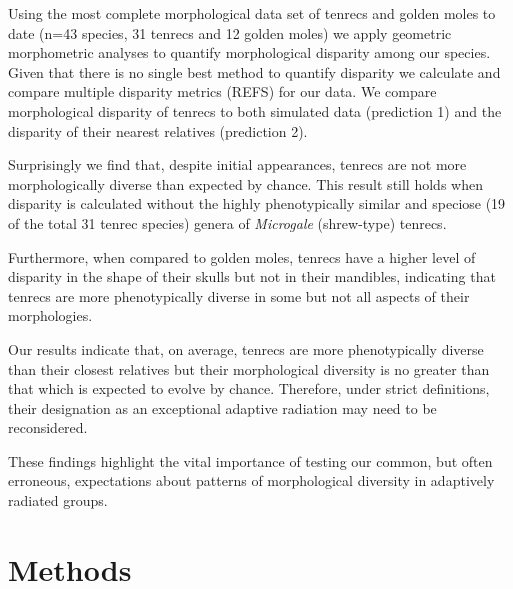 \documentclass[12pt,a4paper]{article}
\begin{document}
Using the most complete morphological data set of tenrecs and golden moles to date (n=43 species, 31 tenrecs and 12 golden moles) we apply geometric morphometric analyses \citep{Rohlf1993, Zelditch2012} to quantify morphological disparity among our species. Given that there is no single best method to quantify disparity \citep{Ciampaglio2001} we calculate and compare multiple disparity metrics (REFS) for our data. We compare morphological disparity of tenrecs to both simulated data (prediction 1) and the disparity of their nearest relatives (prediction 2). %

Surprisingly %
we find that, despite initial appearances, tenrecs are not more morphologically diverse than expected by chance. This result still holds when disparity is calculated without the highly phenotypically similar and speciose (19 of the total 31 tenrec species) genera of \textit{Microgale} (shrew-type) tenrecs.

Furthermore, when compared to golden moles, tenrecs have a higher level of disparity in the shape of their skulls but not in their mandibles, indicating that tenrecs are more phenotypically diverse in some but not all aspects of their morphologies.%

Our results indicate that, on average, tenrecs are more phenotypically diverse than their closest relatives but their morphological diversity is no greater than that which is expected to evolve by chance. Therefore, under strict definitions, their designation as an exceptional adaptive radiation may need to be reconsidered. 

These findings highlight the vital importance of testing our common, but often erroneous, expectations about patterns of morphological diversity in adaptively radiated groups. 


\section{Methods}
\end{document}
